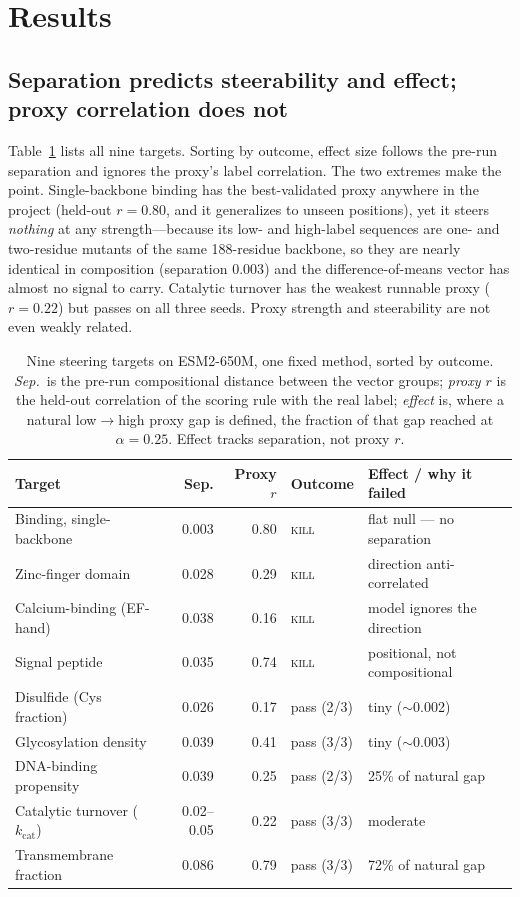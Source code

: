 \documentclass[11pt]{article}
\begin{document}
\section{Results}

\subsection{Separation predicts steerability and effect; proxy correlation does not}

Table~\ref{tab:scoreboard} lists all nine targets. Sorting by outcome, effect
size follows the pre-run separation and ignores the proxy's label correlation.
The two extremes make the point. Single-backbone binding has the best-validated
proxy anywhere in the project (held-out $r=0.80$, and it generalizes to unseen
positions), yet it steers \emph{nothing} at any strength---because its low- and
high-label sequences are one- and two-residue mutants of the same 188-residue
backbone, so they are nearly identical in composition (separation $0.003$) and
the difference-of-means vector has almost no signal to carry. Catalytic turnover
has the weakest runnable proxy ($r=0.22$) but passes on all three seeds. Proxy
strength and steerability are not even weakly related.

\begin{table}[htbp]
\centering
\caption{Nine steering targets on ESM2-650M, one fixed method, sorted by
outcome. \emph{Sep.}\ is the pre-run compositional distance between the vector
groups; \emph{proxy $r$} is the held-out correlation of the scoring rule with
the real label; \emph{effect} is, where a natural low$\to$high proxy gap is
defined, the fraction of that gap reached at $\alpha=0.25$. Effect tracks
separation, not proxy $r$.}
\label{tab:scoreboard}
\begin{tabular}{@{}l r r l l@{}}
\toprule
Target & Sep. & Proxy $r$ & Outcome & Effect / why it failed \\
\midrule
Binding, single-backbone            & 0.003 & 0.80 & \textsc{kill} & flat null --- no separation \\
Zinc-finger domain                  & 0.028 & 0.29 & \textsc{kill} & direction anti-correlated \\
Calcium-binding (EF-hand)           & 0.038 & 0.16 & \textsc{kill} & model ignores the direction \\
Signal peptide                      & 0.035 & 0.74 & \textsc{kill} & positional, not compositional \\
\addlinespace
Disulfide (Cys fraction)            & 0.026 & 0.17 & pass (2/3) & tiny ($\sim$0.002) \\
Glycosylation density               & 0.039 & 0.41 & pass (3/3) & tiny ($\sim$0.003) \\
DNA-binding propensity              & 0.039 & 0.25 & pass (2/3) & 25\% of natural gap \\
Catalytic turnover ($k_{\mathrm{cat}}$) & 0.02--0.05 & 0.22 & pass (3/3) & moderate \\
Transmembrane fraction              & 0.086 & 0.79 & pass (3/3) & 72\% of natural gap \\
\bottomrule
\end{tabular}
\end{table}
\end{document}

